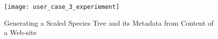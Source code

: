 \documentclass{new_tlp}
\begin{document}

\begin{figure}[t]
	\centering	\texttt{[image: user\_case\_3\_experiement]}
	\caption{Generating a Scaled Species Tree and its Metadata from Content of a Web-site \label{user_case_3_experiement}}
\end{figure}
\end{document}
